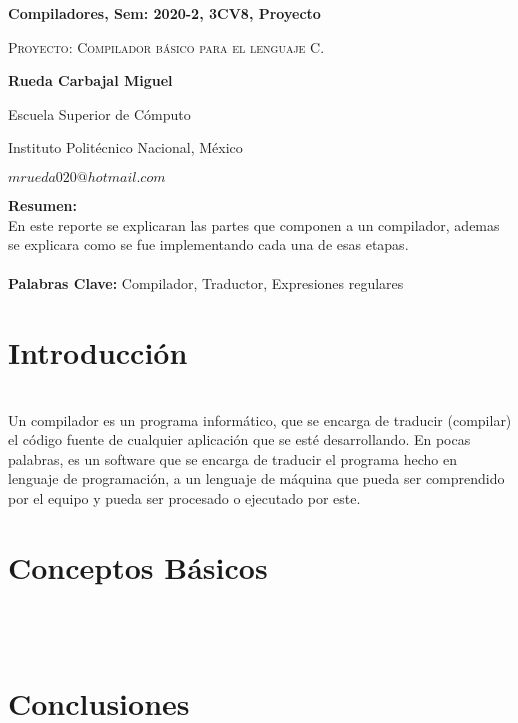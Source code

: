 \documentclass[12pt,twoside]{article}
\date{}
\begin{document}
\centerline{\bf Compiladores, Sem: 2020-2, 3CV8, Proyecto}
\centerline{}
\centerline{}
\begin{center}
\Large{\textsc{Proyecto: Compilador básico para el lenguaje C.}}
\end{center}
\centerline{}
\centerline{\bf {Rueda Carbajal Miguel}}
\centerline{}
\centerline{Escuela Superior de C\'omputo}
\centerline{Instituto Polit\'ecnico Nacional, M\'exico}
\centerline{$mrueda020@hotmail.com$}
\newtheorem{Theorem}{\quad Theorem}[section]
\newtheorem{Definition}[Theorem]{\quad Definition}
\newtheorem{Corollary}[Theorem]{\quad Corollary}
\newtheorem{Lemma}[Theorem]{\quad Lemma}
\newtheorem{Example}[Theorem]{\quad Example}
\bigskip
\textbf{Resumen: }\\
En este reporte se explicaran las partes que componen a un compilador, ademas se explicara como se fue implementando cada una de esas etapas.  
\textbf{}\\
\textbf{}\\
\textbf{Palabras Clave: }
Compilador, Traductor, Expresiones regulares 
\section{Introducción}
\text{}\\
Un compilador es un programa informático, que se encarga de traducir (compilar) el código fuente de cualquier aplicación que se esté desarrollando. En pocas palabras, es un software que se encarga de traducir el programa hecho en lenguaje de programación, a un lenguaje de máquina que pueda ser comprendido por el equipo y pueda ser procesado o ejecutado por este.

\section{Conceptos B\'asicos}
\text{}\\





\text{}\\
\clearpage

\clearpage
\section{Conclusiones}
\end{document}
